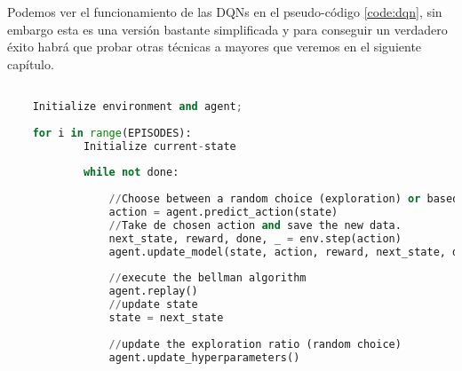 Podemos ver el funcionamiento de las DQNs en el pseudo-código \ref{code:dqn}, sin embargo esta es una versión bastante simplificada y para conseguir un verdadero éxito habrá que probar otras técnicas a mayores que veremos en el siguiente capítulo.

\begin{minipage}{0.9\linewidth}%
    \begin{lstlisting}[frame=tb, language=python, caption=Pseudocódigo DQN,   inputencoding=latin1, label={code:dqn}]

    Initialize environment and agent;
    
    for i in range(EPISODES):
            Initialize current-state   
            
            while not done:
         
                //Choose between a random choice (exploration) or based in the enviroment memory.
                action = agent.predict_action(state)
                //Take de chosen action and save the new data.
                next_state, reward, done, _ = env.step(action)
                agent.update_model(state, action, reward, next_state, done)
                
                //execute the bellman algorithm
                agent.replay()
                //update state
                state = next_state
                
                //update the exploration ratio (random choice)
                agent.update_hyperparameters()
    \end{lstlisting}%
\end{minipage}
